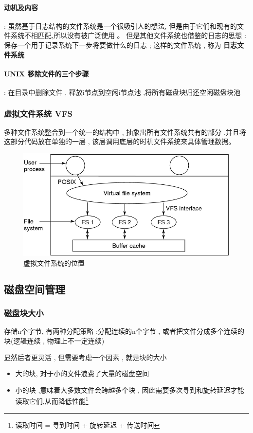 \documentclass[UTF8,a4paper]{ctexart}
\begin{document}
\paragraph{动机及内容} : 虽然基于日志结构的文件系统是一个很吸引人的想法, 但是由于它们和现有的文件系统不相匹配,所以没有被广泛使用 。 但是其他文件系统也借鉴的日志的思想 : 保存一个用于记录系统下一步将要做什么的日志 ; 这样的文件系统 , 称为 \textbf{日志文件系统}

\paragraph{UNIX 移除文件的三个步骤} : 在目录中删除文件 , 释放i节点到空闲i节点池 ,将所有磁盘块归还空闲磁盘块池


\subsubsection{虚拟文件系统 VFS}
多种文件系统整合到一个统一的结构中 , 抽象出所有文件系统共有的部分 ,并且将这部分代码放在单独的一层 , 该层调用底层的时机文件系统来具体管理数据。

\begin{figure}[H]
	\centering
	\includegraphics[scale = 0.5]{assets/ModernOperatingSystems/2018-01-08-16-50-41.png}
	\caption{虚拟文件系统的位置}
\end{figure}

\subsection{磁盘空间管理}
\subsubsection{磁盘块大小}
存储n个字节, 有两种分配策略 :分配连续的n个字节 , 或者把文件分成多个连续的块(逻辑连续 , 物理上不一定连续)

显然后者更灵活 , 但需要考虑一个因素 , 就是块的大小
\begin{itemize}
	\item 大的块, 对于小的文件浪费了大量的磁盘空间
	\item 小的块 ,意味着大多数文件会跨越多个块 , 因此需要多次寻到和旋转延迟才能读取它们,从而降低性能\footnote{读取时间 = 寻到时间 + 旋转延迟 + 传送时间}
\end{itemize}
\end{document}
